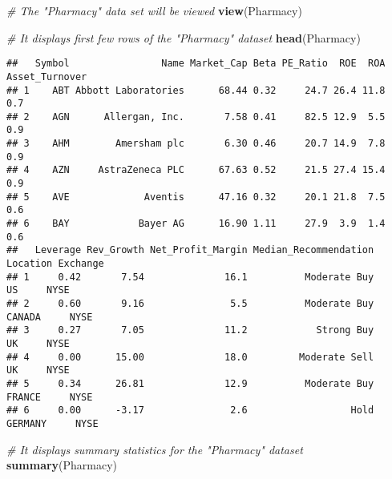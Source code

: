\documentclass[
]{article}
\newenvironment{Shaded}{\begin{snugshade}}{\end{snugshade}}
\newcommand{\CommentTok}[1]{\textcolor[rgb]{0.56,0.35,0.01}{\textit{#1}}}
\newcommand{\FunctionTok}[1]{\textcolor[rgb]{0.13,0.29,0.53}{\textbf{#1}}}
\newcommand{\NormalTok}[1]{#1}
\begin{document}
\begin{Shaded}
\begin{Highlighting}[]
\CommentTok{\# The "Pharmacy" data set will be viewed}
\FunctionTok{view}\NormalTok{(Pharmacy)}
\end{Highlighting}
\end{Shaded}

\begin{Shaded}
\begin{Highlighting}[]
\CommentTok{\#  It displays first few rows of the "Pharmacy" dataset}
\FunctionTok{head}\NormalTok{(Pharmacy)}
\end{Highlighting}
\end{Shaded}

\begin{verbatim}
##   Symbol                Name Market_Cap Beta PE_Ratio  ROE  ROA Asset_Turnover
## 1    ABT Abbott Laboratories      68.44 0.32     24.7 26.4 11.8            0.7
## 2    AGN      Allergan, Inc.       7.58 0.41     82.5 12.9  5.5            0.9
## 3    AHM        Amersham plc       6.30 0.46     20.7 14.9  7.8            0.9
## 4    AZN     AstraZeneca PLC      67.63 0.52     21.5 27.4 15.4            0.9
## 5    AVE             Aventis      47.16 0.32     20.1 21.8  7.5            0.6
## 6    BAY            Bayer AG      16.90 1.11     27.9  3.9  1.4            0.6
##   Leverage Rev_Growth Net_Profit_Margin Median_Recommendation Location Exchange
## 1     0.42       7.54              16.1          Moderate Buy       US     NYSE
## 2     0.60       9.16               5.5          Moderate Buy   CANADA     NYSE
## 3     0.27       7.05              11.2            Strong Buy       UK     NYSE
## 4     0.00      15.00              18.0         Moderate Sell       UK     NYSE
## 5     0.34      26.81              12.9          Moderate Buy   FRANCE     NYSE
## 6     0.00      -3.17               2.6                  Hold  GERMANY     NYSE
\end{verbatim}

\begin{Shaded}
\begin{Highlighting}[]
\CommentTok{\# It displays summary statistics for the "Pharmacy" dataset}
\FunctionTok{summary}\NormalTok{(Pharmacy)}
\end{Highlighting}
\end{Shaded}
\end{document}
